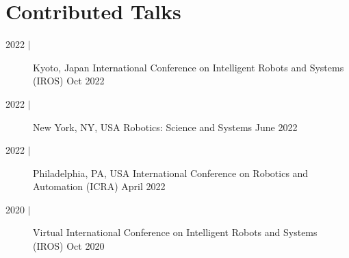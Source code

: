 \documentclass{cv_style}
\begin{document}
    \section{Contributed Talks}
        \begin{description}
            \item[2022 $\vert$]
                    {Kyoto, Japan}
                    {International Conference on Intelligent Robots and Systems (IROS)}
                    {Oct 2022}
            \item[2022 $\vert$]
                    {New York, NY, USA}
                    {Robotics: Science and Systems}
                    {June 2022}
            \item[2022 $\vert$]
                    {Philadelphia, PA, USA}
                    {International Conference on Robotics and Automation (ICRA)}
                    {April 2022}
            \item[2020 $\vert$]
                    {Virtual}
                    {International Conference on Intelligent Robots and Systems (IROS)}
                    {Oct 2020}
        \end{description}
\end{document}
